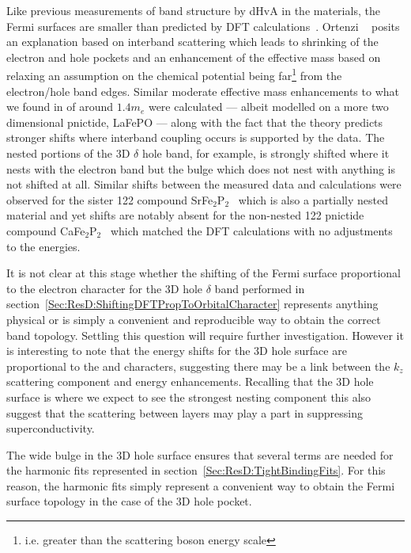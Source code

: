 Like previous measurements of band structure by \ac{dHvA} in the \BaFePAs materials, the Fermi surfaces are smaller than predicted by \ac{DFT} calculations~\cite{Shishido2010, Analytis2010c}. Ortenzi \etal~\cite{Ortenzi2009} posits an explanation based on interband scattering which leads to shrinking of the electron and hole pockets and an enhancement of the effective mass based on relaxing an assumption on the chemical potential being far\footnote{i.e. greater than the scattering boson energy scale} from the electron/hole band edges. Similar moderate effective mass enhancements to what we found in \BaFeP of around $1.4m_e$ were calculated --- albeit modelled on a more two dimensional pnictide, LaFePO --- along with the fact that the theory predicts stronger shifts where interband coupling occurs is supported by the \BaFeP data. The nested portions of the 3D $\delta$ hole band, for example, is strongly shifted where it nests with the electron band but the bulge which does not nest with anything is not shifted at all. Similar shifts between the measured data and calculations were observed for the sister 122 compound SrFe$_2$P$_2$~\cite{Analytis2009} which is also a partially nested material and yet shifts are notably absent for the non-nested 122 pnictide compound CaFe$_2$P$_2$~\cite{Coldea2009} which matched the \ac{DFT} calculations with no adjustments to the energies. 


It is not clear at this stage whether the shifting of the Fermi surface proportional to the electron character for the 3D hole $\delta$ band performed in section~\ref{Sec:ResD:ShiftingDFTPropToOrbitalCharacter} represents anything physical or is simply a convenient and reproducible way to obtain the correct band topology. Settling this question will require further investigation. However it is interesting to note that the energy shifts for the 3D hole surface are proportional to the \DzTwo and \DxzDyz characters, suggesting there may be a link between the $k_z$ scattering component and energy enhancements. Recalling that the 3D hole surface is where we expect to see the strongest nesting component this also suggest that the scattering between layers may play a part in suppressing superconductivity.

The wide bulge in the 3D hole surface ensures that several terms are needed for the harmonic fits represented in section~\ref{Sec:ResD:TightBindingFits}. For this reason, the harmonic fits simply represent a convenient way to obtain the Fermi surface topology in the case of the 3D hole pocket.
